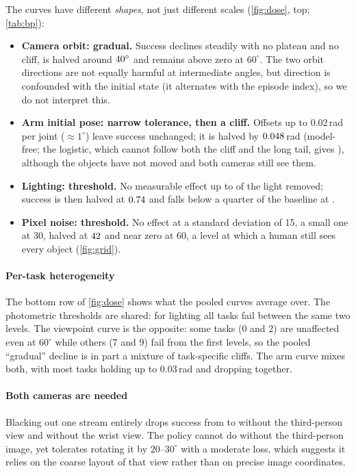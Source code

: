 \documentclass[10pt,twocolumn,letterpaper]{article}
\begin{document}
The curves have different \emph{shapes}, not just different scales (\cref{fig:dose}, top; \cref{tab:bp}):
\begin{itemize}
  \item \textbf{Camera orbit: gradual.} Success declines steadily with no plateau and no cliff, is halved
  around $40^\circ$ and remains above zero at $60^\circ$. The two orbit directions are not equally
  harmful at intermediate angles, but direction is confounded with the initial state (it alternates with
  the episode index), so we do not interpret this.
  \item \textbf{Arm initial pose: narrow tolerance, then a cliff.} Offsets up to 0.02\,rad per joint
  ($\approx1^\circ$) leave success unchanged; it is halved by $0.048$\,rad \RobotXfiftyInterpCI{}
  (model-free; the logistic, which cannot follow both the cliff and the long tail, gives \RobotXfifty{}),
  although the objects have not moved and both cameras still see them.
  \item \textbf{Lighting: threshold.} No measurable effect up to \LightCliffLow{} of the light removed;
  success is then halved at $0.74$ and falls below a quarter of the baseline at \LightCliffHigh{}.
  \item \textbf{Pixel noise: threshold.} No effect at a standard deviation of 15, a small one at 30, halved
  at $42$ \NoiseXfiftyInterpCI{} and near zero at 60, a level at which a human still sees
  every object (\cref{fig:grid}).
\end{itemize}



\paragraph{Per-task heterogeneity} The bottom row of \cref{fig:dose} shows what the pooled curves average over. The
photometric thresholds are shared: for lighting all tasks fail between the same two levels. The viewpoint
curve is the opposite: some tasks (0 and 2) are unaffected even at $60^\circ$ while others (7 and 9) fail from
the first levels, so the pooled ``gradual'' decline is in part a mixture of task-specific cliffs. The arm
curve mixes both, with most tasks holding up to 0.03\,rad and dropping together.

\paragraph{Both cameras are needed} Blacking out one stream entirely drops success from \CamMaskBoth{} to
\CamMaskAgent{} without the third-person view and \CamMaskWrist{} without the wrist view. The policy
cannot do without the third-person image, yet tolerates rotating it by $20$--$30^\circ$ with a moderate loss,
which suggests it relies on the coarse layout of that view rather than on precise image coordinates.
\end{document}
